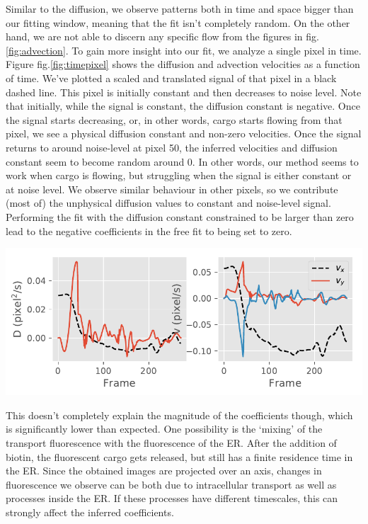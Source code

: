 \documentclass[12pt,a4paper,]{Dissertate}
\let\origfigure\figure
\let\endorigfigure\endfigure
\renewenvironment{figure}[1][2] {
    \expandafter\origfigure\expandafter[H]
} {
    \endorigfigure
}
\begin{document}
Similar to the diffusion, we observe patterns both in time and space
bigger than our fitting window, meaning that the fit isn't completely
random. On the other hand, we are not able to discern any specific flow
from the figures in fig.\ref{fig:advection}. To gain more insight into
our fit, we analyze a single pixel in time. Figure
fig.\ref{fig:timepixel} shows the diffusion and advection velocities as
a function of time. We've plotted a scaled and translated signal of that
pixel in a black dashed line. This pixel is initially constant and then
decreases to noise level. Note that initially, while the signal is
constant, the diffusion constant is negative. Once the signal starts
decreasing, or, in other words, cargo starts flowing from that pixel, we
see a physical diffusion constant and non-zero velocities. Once the
signal returns to around noise-level at pixel 50, the inferred
velocities and diffusion constant seem to become random around 0. In
other words, our method seems to work when cargo is flowing, but
struggling when the signal is either constant or at noise level. We
observe similar behaviour in other pixels, so we contribute (most of)
the unphysical diffusion values to constant and noise-level signal.
Performing the fit with the diffusion constant constrained to be larger
than zero lead to the negative coefficients in the free fit to being set
to zero.

\begin{figure}
\hypertarget{fig:timepixel}{%
\centering
\includegraphics{source/figures/pdf/Fit_LSgeneral_fit.pdf}
\caption{Diffusion and advection velocities of a single pixel in time.
We've plotted (scaled and translated) signal as a black dashed line to
find any correlation.}\label{fig:timepixel}
}
\end{figure}

This doesn't completely explain the magnitude of the coefficients
though, which is significantly lower than expected. One possibility is
the `mixing' of the transport fluorescence with the fluorescence of the
ER. After the addition of biotin, the fluorescent cargo gets released,
but still has a finite residence time in the ER. Since the obtained
images are projected over an axis, changes in fluorescence we observe
can be both due to intracellular transport as well as processes inside
the ER. If these processes have different timescales, this can strongly
affect the inferred coefficients.
\end{document}
